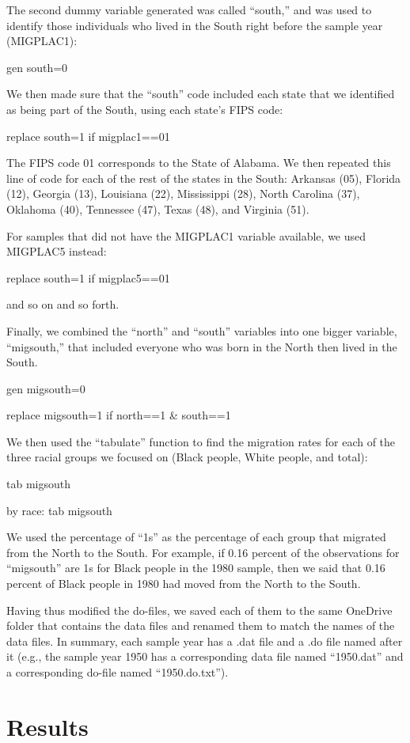 \documentclass[12pt]{article}
\begin{document}
The second dummy variable generated was called “south,” and was used to identify those individuals who lived in the South right before the sample year (MIGPLAC1): 

gen south=0 

We then made sure that the “south” code included each state that we identified as being part of the South, using each state’s FIPS code: 

replace south=1 if migplac1==01 

The FIPS code 01 corresponds to the State of Alabama. We then repeated this line of code for each of the rest of the states in the South: Arkansas (05), Florida (12), Georgia (13), Louisiana (22), Mississippi (28), North Carolina (37), Oklahoma (40), Tennessee (47), Texas (48), and Virginia (51). 

For samples that did not have the MIGPLAC1 variable available, we used MIGPLAC5 instead: 

replace south=1 if migplac5==01 

and so on and so forth. 

Finally, we combined the “north” and “south” variables into one bigger variable, “migsouth,” that included everyone who was born in the North then lived in the South. 

gen migsouth=0 

replace migsouth=1 if north==1 \& south==1 

We then used the “tabulate” function to find the migration rates for each of the three racial groups we focused on (Black people, White people, and total): 

tab migsouth 

by race: tab migsouth 

We used the percentage of “1s” as the percentage of each group that migrated from the North to the South. For example, if 0.16 percent of the observations for “migsouth” are 1s for Black people in the 1980 sample, then we said that 0.16 percent of Black people in 1980 had moved from the North to the South. 

Having thus modified the do-files, we saved each of them to the same OneDrive folder that contains the data files and renamed them to match the names of the data files. In summary, each sample year has a .dat file and a .do file named after it (e.g., the sample year 1950 has a corresponding data file named “1950.dat” and a corresponding do-file named “1950.do.txt”).  

\section{Results}
\label{sec:result}
\end{document}
